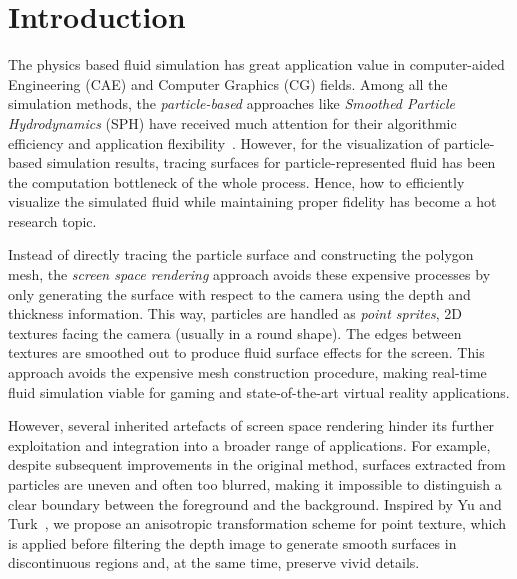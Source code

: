 \documentclass[times,twocolumn,final]{elsarticle}
\begin{document}
\linenumbers

\section{Introduction}
\label{sec1}


The physics based fluid simulation has great application value in computer-aided Engineering (CAE) and Computer Graphics (CG) fields.
Among all the simulation methods, the \emph{particle-based} approaches like \emph{Smoothed Particle Hydrodynamics} (SPH) have received much attention for their algorithmic efficiency and application flexibility~\cite{Ihmsen14}. 
However, for the visualization of particle-based simulation results, tracing surfaces for particle-represented fluid has been the computation bottleneck of the whole process. Hence, how to efficiently visualize the simulated fluid while maintaining proper fidelity has become a hot research topic.

Instead of directly tracing the particle surface and constructing the polygon mesh, the \emph{screen space rendering} approach avoids these expensive processes by only generating the surface with respect to the camera using the depth and thickness information. This way, particles are handled as \emph{point sprites}, 2D textures facing the camera (usually in a round shape). The edges between textures are smoothed out to produce fluid surface effects for the screen\cite{ref:ref2}. This approach avoids the expensive mesh construction procedure, making real-time fluid simulation viable for gaming and state-of-the-art virtual reality applications\cite{ref:ref3}. 

However, several inherited artefacts of screen space rendering hinder its further exploitation and integration into a broader range of applications. For example, despite subsequent improvements in the original method, surfaces extracted from particles are uneven and often too blurred, making it impossible to distinguish a clear boundary between the foreground and the background. Inspired by Yu and Turk~\cite{yu2013reconstructing}, we propose an anisotropic transformation scheme for point texture, which is applied before filtering the depth image to generate smooth surfaces in discontinuous regions and, at the same time, preserve vivid details.
\end{document}

